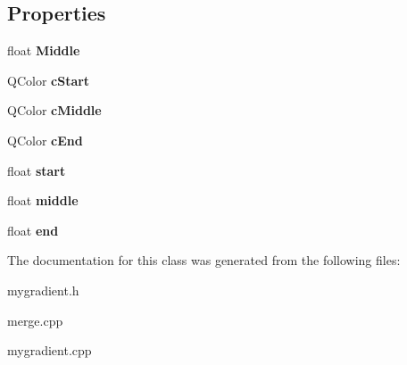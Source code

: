 \subsection*{Properties}
\begin{DoxyCompactItemize}
\item 
\hypertarget{class_my_gradient_ac84c06b398f8b56bfbb7df2d92823ba9}{float {\bfseries Middle}}\label{class_my_gradient_ac84c06b398f8b56bfbb7df2d92823ba9}

\item 
\hypertarget{class_my_gradient_a7cf03f924418dcc57e2e03ed2f27fc88}{Q\-Color {\bfseries c\-Start}}\label{class_my_gradient_a7cf03f924418dcc57e2e03ed2f27fc88}

\item 
\hypertarget{class_my_gradient_a1680b943f4644e745fe1543461343234}{Q\-Color {\bfseries c\-Middle}}\label{class_my_gradient_a1680b943f4644e745fe1543461343234}

\item 
\hypertarget{class_my_gradient_a5970c7e15913cb02a35433891d969a94}{Q\-Color {\bfseries c\-End}}\label{class_my_gradient_a5970c7e15913cb02a35433891d969a94}

\item 
\hypertarget{class_my_gradient_a2afe04c6cbf3e2abbbfb2987707cc7fb}{float {\bfseries start}}\label{class_my_gradient_a2afe04c6cbf3e2abbbfb2987707cc7fb}

\item 
\hypertarget{class_my_gradient_a96e799bbd6ca5334eaa89d3c952272bd}{float {\bfseries middle}}\label{class_my_gradient_a96e799bbd6ca5334eaa89d3c952272bd}

\item 
\hypertarget{class_my_gradient_ab6ce1fa1f132699b9d2302c327afdc16}{float {\bfseries end}}\label{class_my_gradient_ab6ce1fa1f132699b9d2302c327afdc16}

\end{DoxyCompactItemize}


The documentation for this class was generated from the following files\-:\begin{DoxyCompactItemize}
\item 
mygradient.\-h\item 
merge.\-cpp\item 
mygradient.\-cpp\end{DoxyCompactItemize}
